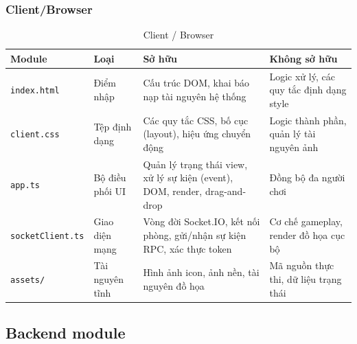 \subsubsection{Client/Browser}

\begin{table}[H]
    \centering
    \renewcommand{\arraystretch}{1.3}
    \setlength{\tabcolsep}{6pt}
    \begin{tabular}{|>{\RaggedRight\arraybackslash}p{3.2cm}|>{\RaggedRight\arraybackslash}p{2.8cm}|>{\RaggedRight\arraybackslash}p{4.8cm}|>{\RaggedRight\arraybackslash}p{4.8cm}|}
        \hline
        \rowcolor[rgb]{0.8, 0.9, 1.0}
        \textbf{Module} & \textbf{Loại} & \textbf{Sở hữu} & \textbf{Không sở hữu} \\ \hline

        \texttt{index.html} & Điểm nhập &
        Cấu trúc DOM, khai báo nạp tài nguyên hệ thống &
        Logic xử lý, các quy tắc định dạng style \\ \hline


        \texttt{client.css} & Tệp định dạng &
        Các quy tắc CSS, bố cục (layout), hiệu ứng chuyển động &
        Logic thành phần, quản lý tài nguyên ảnh \\ \hline

        \texttt{app.ts} & Bộ điều phối UI &
        Quản lý trạng thái view, xử lý sự kiện (event), DOM, render, drag-and-drop &
        Đồng bộ đa người chơi \\ \hline

        \texttt{socketClient.ts} & Giao diện mạng & Vòng đời Socket.IO, kết nối phòng, gửi/nhận sự kiện RPC, xác thực token & Cơ chế gameplay, render đồ họa cục bộ \\ \hline

        \texttt{assets/} & Tài nguyên tĩnh &
        Hình ảnh icon, ảnh nền, tài nguyên đồ họa &
        Mã nguồn thực thi, dữ liệu trạng thái \\ \hline

    \end{tabular}
    \caption{Client / Browser}
\end{table}

\subsection{Backend module}

